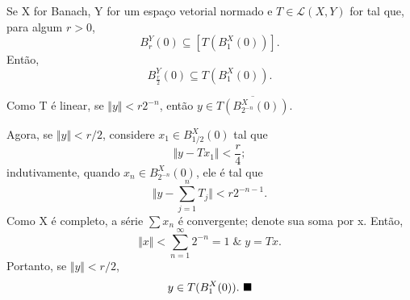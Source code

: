 \documentclass[../functional_analysis.tex]{subfiles}
\begin{document}
\begin{lemma*}
	Se X for Banach, Y for um espaço vetorial normado e \(T\in \mathcal{L}(X, Y)\) for tal que, para algum \(r> 0\),
	\[
		B_{r}^{Y}(0)\subseteq [T(B_{1}^{X}(0))].
	\]
	Então,
	\[
		B_{\frac{r}{2}}^{Y}(0)\subseteq T(B_{1}^{X}(0)).
	\]
\end{lemma*}
\begin{proof*}
	Como T é linear, se \(\Vert y \Vert < r2^{-n}\), então \(y\in \overline{T(B_{2^{-n}}^{X}(0))}.\)

	Agora, se \(\Vert y \Vert < r/2\), considere \(x_1\in B_{1/2}^{X}(0)\) tal que
	\[
		\Vert y-Tx_1 \Vert < \frac{r}{4};
	\]
	indutivamente, quando \(x_{n}\in B_{2^{-n}}^{X}(0)\), ele é tal que
	\[
		\biggl\Vert y- \sum\limits_{j=1}^{n}T_{j} \biggr\Vert < r2^{-n-1}.
	\]
	Como X é completo, a série \(\sum x_{n}\) é convergente; denote sua soma por x. Então,
	\[
		\Vert x \Vert < \sum\limits_{n=1}^{\infty}2^{-n}=1\;\&\; y = Tx.
	\]
	Portanto, se \(\Vert y \Vert < r/2\),
	\[
		y\in T(B_{1}^{X}(0)).\text{ $\blacksquare$}
	\]

\end{proof*}
\end{document}
